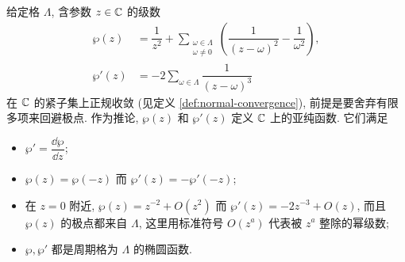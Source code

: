 \begin{definition-theorem}\label{def:wp} 
	给定格 $\Lambda$, 含参数 $z \in \mathbb{C}$ 的级数
	\begin{align*}
		\wp(z) & = \dfrac{1}{z^2} + \sum_{\substack{\omega \in \Lambda \\ \omega \neq 0}} \left( \dfrac{1}{(z - \omega)^2} - \dfrac{1}{\omega^2} \right), \\
		\wp'(z) & = -2 \sum_{\omega \in \Lambda} \dfrac{1}{(z - \omega)^3}
	\end{align*}
	在 $\mathbb{C}$ 的紧子集上正规收敛 (见定义 \ref{def:normal-convergence}), 前提是要舍弃有限多项来回避极点. 作为推论, $\wp(z)$ 和 $\wp'(z)$ 定义 $\mathbb{C}$ 上的亚纯函数. 它们满足
	\begin{itemize}
		\item $\wp' = \dfrac{\dd \wp}{\dd z}$;
		\item $\wp(z) = \wp(-z)$ 而 $\wp'(z) = -\wp'(-z)$;
		\item 在 $z=0$ 附近, $\wp(z) = z^{-2} + O(z^2)$ 而 $\wp'(z) = -2 z^{-3} + O(z)$, 而且 $\wp(z)$ 的极点都来自 $\Lambda$, 这里用标准符号 $O(z^a)$ 代表被 $z^a$ 整除的幂级数;
		\item $\wp, \wp'$ 都是周期格为 $\Lambda$ 的椭圆函数.
	\end{itemize}
\end{definition-theorem}
